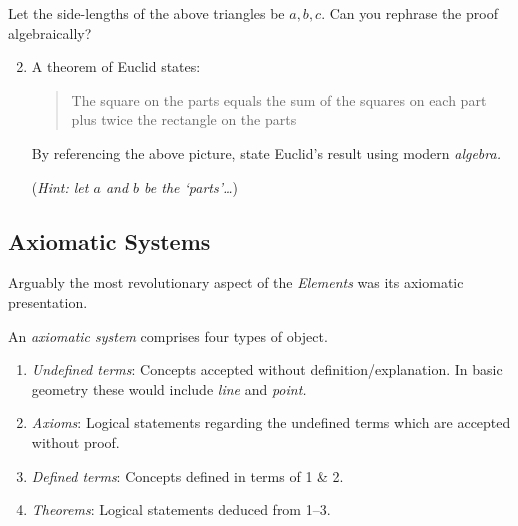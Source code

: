 \begin{exercises}{}{}
\exstart Let the side-lengths of the above triangles be $a,b,c$. Can you rephrase the proof algebraically?
\begin{enumerate}\setcounter{enumi}{1}
	\item A theorem of Euclid states:
	\begin{quote}
	The square on the parts equals the sum of the squares on each part plus twice the rectangle on the parts
	\end{quote}
	By referencing the above picture, state Euclid's result using modern \emph{algebra.}\par
	(\emph{Hint: let $a$ and $b$ be the `parts'\ldots})
\end{enumerate}
\end{exercises}

\clearpage



\subsection{Axiomatic Systems}


Arguably the most revolutionary aspect of the \emph{Elements} was its axiomatic presentation.

\begin{defn}{}{}
An \emph{axiomatic system} comprises four types of object.\vspace{-5pt}
\begin{enumerate}\itemsep0pt
  \item \emph{Undefined terms}: Concepts accepted without definition/explanation. In basic geometry these would include \emph{line} and \emph{point.}
  \item \emph{Axioms}: Logical statements regarding the undefined terms which are accepted without proof.
  \item \emph{Defined terms}: Concepts defined in terms of 1 \& 2.
  \item \emph{Theorems}: Logical statements deduced from 1--3.
\end{enumerate}
\end{defn}


